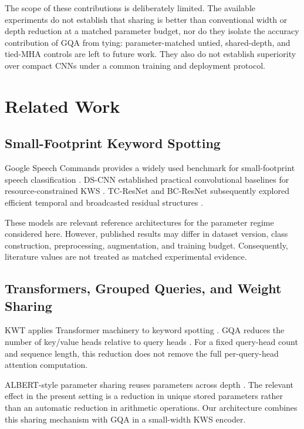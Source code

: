 \documentclass[journal]{IEEEtran}
\begin{document}
The scope of these contributions is deliberately limited.
The available experiments do not establish that sharing is better
than conventional width or depth reduction at a matched parameter
budget, nor do they isolate the accuracy contribution of GQA from
tying: parameter-matched untied, shared-depth, and tied-MHA
controls are left to future work.
They also do not establish superiority over compact CNNs under a
common training and deployment protocol.

\section{Related Work}

\subsection{Small-Footprint Keyword Spotting}

Google Speech Commands provides a widely used benchmark for
small-footprint speech classification
\cite{warden2018speech}.
DS-CNN established practical convolutional baselines for
resource-constrained KWS
\cite{zhang2017hello}.
TC-ResNet and BC-ResNet subsequently explored efficient temporal
and broadcasted residual structures
\cite{choi2019temporal,kim2021bcresnet}.

These models are relevant reference architectures for the parameter
regime considered here.
However, published results may differ in dataset version,
class construction, preprocessing, augmentation, and training budget.
Consequently, literature values are not treated as matched
experimental evidence.

\subsection{Transformers, Grouped Queries, and Weight Sharing}

KWT applies Transformer machinery to keyword spotting
\cite{berg2021kwt}.
GQA reduces the number of key/value heads relative to query heads
\cite{ainslie2023gqa}.
For a fixed query-head count and sequence length, this reduction
does not remove the full per-query-head attention computation.

ALBERT-style parameter sharing reuses parameters across depth
\cite{lan2020albert}.
The relevant effect in the present setting is a reduction in unique
stored parameters rather than an automatic reduction in arithmetic
operations.
Our architecture combines this sharing mechanism with GQA in a
small-width KWS encoder.
\end{document}
